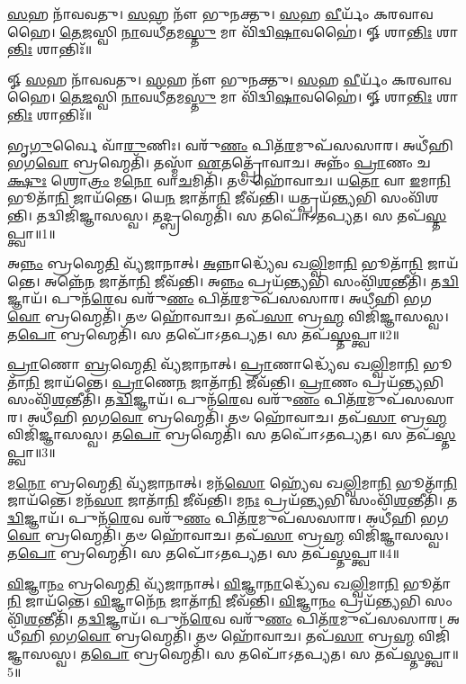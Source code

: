 \-\ul{𑌸}\-𑌹 𑌨𑌾᳴𑌵𑌵𑌤𑍁। 
\-\ul{𑌸}\-𑌹 𑌨𑍗᳴ 𑌭𑍁𑌨𑌕𑍍𑌤𑍁। 
\-\ul{𑌸}\-𑌹 \ul{𑌵𑍀}\-𑌰𑍍𑌯𑌂᳴ 𑌕𑌰𑌵𑌾𑌵𑌹𑍈। 
\-\ul{𑌤𑍇}\-\-\ul{𑌜}\-𑌸𑍍𑌵𑌿 \ul{𑌨𑌾}\-𑌵𑌧𑍀᳴𑌤𑌮\-\ul{𑌸𑍍𑌤𑍁} 𑌮𑌾 𑌵𑌿᳴𑌦𑍍𑌵𑌿\-\ul{𑌷𑌾}\-𑌵𑌹𑍈॑। 
𑍐 𑌶𑌾\-\ul{𑌨𑍍𑌤𑌿𑌃} 𑌶𑌾\-\ul{𑌨𑍍𑌤𑌿𑌃} 𑌶𑌾𑌨𑍍𑌤𑌿𑌃᳴॥

\setcounter{anuvakam}{0}
𑍐 \ul{𑌸}\-𑌹 𑌨𑌾᳴𑌵𑌵𑌤𑍁। 
\-\ul{𑌸}\-𑌹 𑌨𑍗᳴ 𑌭𑍁𑌨𑌕𑍍𑌤𑍁। 
\-\ul{𑌸}\-𑌹 \ul{𑌵𑍀}\-𑌰𑍍𑌯𑌂᳴ 𑌕𑌰𑌵𑌾𑌵𑌹𑍈। 
\-\ul{𑌤𑍇}\-\-\ul{𑌜}\-𑌸𑍍𑌵𑌿 \ul{𑌨𑌾}\-𑌵𑌧𑍀᳴𑌤𑌮\-\ul{𑌸𑍍𑌤𑍁} 𑌮𑌾 𑌵𑌿᳴𑌦𑍍𑌵𑌿\-\ul{𑌷𑌾}\-𑌵𑌹𑍈॑। 
𑍐 𑌶𑌾\-\ul{𑌨𑍍𑌤𑌿𑌃} 𑌶𑌾\-\ul{𑌨𑍍𑌤𑌿𑌃} 𑌶𑌾𑌨𑍍𑌤𑌿𑌃᳴॥


𑌭𑍃\-\ul{𑌗𑍁}\-𑌰𑍍𑌵𑍈 𑌵𑌾᳴\-\ul{𑌰𑍁}\-𑌣𑌿𑌃। 
𑌵𑌰𑍁᳴\-\ul{𑌣𑌂} 𑌪𑌿𑌤᳴\-\ul{𑌰}\-𑌮𑍁𑌪᳴𑌸𑌸𑌾𑌰। 
𑌅𑌧𑍀᳴𑌹𑌿 𑌭𑌗\-\ul{𑌵𑍋} 𑌬𑍍𑌰𑌹𑍍𑌮𑍇𑌤𑌿᳴। 
𑌤𑌸𑍍𑌮𑌾᳴ \ul{𑌏}\-𑌤𑌤𑍍𑌪𑍍𑌰𑍋᳴𑌵𑌾𑌚। 
𑌅𑌨𑍍𑌨𑌂᳴ \ul{𑌪𑍍𑌰𑌾}\-𑌣𑌂 𑌚\-\ul{𑌕𑍍𑌷𑍁𑌃} 𑌶𑍍𑌰𑍋\-\ul{𑌤𑍍𑌰𑌂} 𑌮\-\ul{𑌨𑍋} 𑌵𑌾\-\ul{𑌚}\-𑌮𑌿𑌤𑌿᳴। 
𑌤𑍞 𑌹𑍋᳴𑌵𑌾𑌚। 
𑌯\-\ul{𑌤𑍋} 𑌵𑌾 \ul{𑌇}\-𑌮𑌾\-\ul{𑌨𑌿} 𑌭𑍂𑌤𑌾᳴\-\ul{𑌨𑌿} 𑌜𑌾𑌯᳴𑌨𑍍𑌤𑍇। 
𑌯𑍇\-\ul{𑌨} 𑌜𑌾𑌤𑌾᳴\-\ul{𑌨𑌿} 𑌜𑍀𑌵᳴𑌨𑍍𑌤𑌿। 
𑌯𑌤𑍍𑌪𑍍𑌰𑌯᳴\-\ul{𑌨𑍍𑌤𑍍𑌯}\-𑌭𑌿 𑌸𑌂𑌵𑌿᳴𑌶𑌨𑍍𑌤𑌿। 
𑌤𑌦𑍍𑌵𑌿𑌜𑌿᳴𑌜𑍍𑌞𑌾𑌸𑌸𑍍𑌵। 
𑌤𑌦𑍍𑌬𑍍𑌰𑌹𑍍𑌮𑍇𑌤𑌿᳴। 
𑌸 𑌤𑌪𑍋᳴𑌽𑌤𑌪𑍍𑌯𑌤। 
𑌸 𑌤𑌪᳴\-\ul{𑌸𑍍𑌤}\-𑌪𑍍𑌤𑍍𑌵𑌾॥1॥

𑌅\-\ul{𑌨𑍍𑌨𑌂} 𑌬𑍍𑌰𑌹𑍍𑌮𑍇\-\ul{𑌤𑌿} 𑌵𑍍𑌯᳴𑌜𑌾𑌨𑌾𑌤𑍍। 
\-\ul{𑌅}\-𑌨𑍍𑌨𑌾𑌦𑍍𑌧𑍍𑌯𑍇᳴𑌵 𑌖\-\ul{𑌲𑍍𑌵𑌿}\-𑌮𑌾\-\ul{𑌨𑌿} 𑌭𑍂𑌤𑌾᳴\-\ul{𑌨𑌿} 𑌜𑌾𑌯᳴𑌨𑍍𑌤𑍇। 
𑌅𑌨𑍍𑌨𑍇᳴\-\ul{𑌨} 𑌜𑌾𑌤𑌾᳴\-\ul{𑌨𑌿} 𑌜𑍀𑌵᳴𑌨𑍍𑌤𑌿। 
𑌅\-\ul{𑌨𑍍𑌨𑌂} 𑌪𑍍𑌰𑌯᳴\-\ul{𑌨𑍍𑌤𑍍𑌯}\-𑌭𑌿 𑌸𑌂𑌵𑌿᳴\-\ul{𑌶}\-𑌨𑍍𑌤𑍀𑌤𑌿᳴। 
𑌤\-\ul{𑌦𑍍𑌵𑌿}\-𑌜𑍍𑌞𑌾𑌯᳴। 
𑌪𑍁𑌨᳴\-\ul{𑌰𑍇}\-𑌵 𑌵𑌰𑍁᳴\-\ul{𑌣𑌂} 𑌪𑌿𑌤᳴\-\ul{𑌰}\-𑌮𑍁𑌪᳴𑌸𑌸𑌾𑌰। 
𑌅𑌧𑍀᳴𑌹𑌿 𑌭𑌗\-\ul{𑌵𑍋} 𑌬𑍍𑌰𑌹𑍍𑌮𑍇𑌤𑌿᳴। 
𑌤𑍞 𑌹𑍋᳴𑌵𑌾𑌚। 
𑌤𑌪᳴\-\ul{𑌸𑌾} 𑌬𑍍𑌰\-\ul{𑌹𑍍𑌮} 𑌵𑌿𑌜𑌿᳴𑌜𑍍𑌞𑌾𑌸𑌸𑍍𑌵। 
𑌤\-\ul{𑌪𑍋} 𑌬𑍍𑌰𑌹𑍍𑌮𑍇𑌤𑌿᳴। 
𑌸 𑌤𑌪𑍋᳴𑌽𑌤𑌪𑍍𑌯𑌤। 
𑌸 𑌤𑌪᳴\-\ul{𑌸𑍍𑌤}\-𑌪𑍍𑌤𑍍𑌵𑌾॥2॥

\-\ul{𑌪𑍍𑌰𑌾}\-𑌣𑍋 \ul{𑌬𑍍𑌰}\-𑌹𑍍𑌮𑍇\-\ul{𑌤𑌿} 𑌵𑍍𑌯᳴𑌜𑌾𑌨𑌾𑌤𑍍। 
\-\ul{𑌪𑍍𑌰𑌾}\-𑌣𑌾𑌦𑍍𑌧𑍍𑌯𑍇᳴𑌵 𑌖\-\ul{𑌲𑍍𑌵𑌿}\-𑌮𑌾\-\ul{𑌨𑌿} 𑌭𑍂𑌤𑌾᳴\-\ul{𑌨𑌿} 𑌜𑌾𑌯᳴𑌨𑍍𑌤𑍇। 
\-\ul{𑌪𑍍𑌰𑌾}\-𑌣𑍇\-\ul{𑌨} 𑌜𑌾𑌤𑌾᳴\-\ul{𑌨𑌿} 𑌜𑍀𑌵᳴𑌨𑍍𑌤𑌿। 
\-\ul{𑌪𑍍𑌰𑌾}\-𑌣𑌂 𑌪𑍍𑌰𑌯᳴\-\ul{𑌨𑍍𑌤𑍍𑌯}\-𑌭𑌿 𑌸𑌂𑌵𑌿᳴\-\ul{𑌶}\-𑌨𑍍𑌤𑍀𑌤𑌿᳴। 
𑌤\-\ul{𑌦𑍍𑌵𑌿}\-𑌜𑍍𑌞𑌾𑌯᳴। 
𑌪𑍁𑌨᳴\-\ul{𑌰𑍇}\-𑌵 𑌵𑌰𑍁᳴\-\ul{𑌣𑌂} 𑌪𑌿𑌤᳴\-\ul{𑌰}\-𑌮𑍁𑌪᳴𑌸𑌸𑌾𑌰। 
𑌅𑌧𑍀᳴𑌹𑌿 𑌭𑌗\-\ul{𑌵𑍋} 𑌬𑍍𑌰𑌹𑍍𑌮𑍇𑌤𑌿᳴। 
𑌤𑍞 𑌹𑍋᳴𑌵𑌾𑌚। 
𑌤𑌪᳴\-\ul{𑌸𑌾} 𑌬𑍍𑌰\-\ul{𑌹𑍍𑌮} 𑌵𑌿𑌜𑌿᳴𑌜𑍍𑌞𑌾𑌸𑌸𑍍𑌵। 
𑌤\-\ul{𑌪𑍋} 𑌬𑍍𑌰𑌹𑍍𑌮𑍇𑌤𑌿᳴। 
𑌸 𑌤𑌪𑍋᳴𑌽𑌤𑌪𑍍𑌯𑌤। 
𑌸 𑌤𑌪᳴\-\ul{𑌸𑍍𑌤}\-𑌪𑍍𑌤𑍍𑌵𑌾॥3॥

𑌮\-\ul{𑌨𑍋} 𑌬𑍍𑌰𑌹𑍍𑌮𑍇\-\ul{𑌤𑌿} 𑌵𑍍𑌯᳴𑌜𑌾𑌨𑌾𑌤𑍍। 
𑌮𑌨᳴\-\ul{𑌸𑍋} 𑌹𑍍𑌯𑍇᳴𑌵 𑌖\-\ul{𑌲𑍍𑌵𑌿}\-𑌮𑌾\-\ul{𑌨𑌿} 𑌭𑍂𑌤𑌾᳴\-\ul{𑌨𑌿} 𑌜𑌾𑌯᳴𑌨𑍍𑌤𑍇। 
𑌮𑌨᳴\-\ul{𑌸𑌾} 𑌜𑌾𑌤𑌾᳴\-\ul{𑌨𑌿} 𑌜𑍀𑌵᳴𑌨𑍍𑌤𑌿। 
𑌮\-\ul{𑌨𑌃} 𑌪𑍍𑌰𑌯᳴\-\ul{𑌨𑍍𑌤𑍍𑌯}\-𑌭𑌿 𑌸𑌂𑌵𑌿᳴\-\ul{𑌶}\-𑌨𑍍𑌤𑍀𑌤𑌿᳴। 
𑌤\-\ul{𑌦𑍍𑌵𑌿}\-𑌜𑍍𑌞𑌾𑌯᳴। 
𑌪𑍁𑌨᳴\-\ul{𑌰𑍇}\-𑌵 𑌵𑌰𑍁᳴\-\ul{𑌣𑌂} 𑌪𑌿𑌤᳴\-\ul{𑌰}\-𑌮𑍁𑌪᳴𑌸𑌸𑌾𑌰। 
𑌅𑌧𑍀᳴𑌹𑌿 𑌭𑌗\-\ul{𑌵𑍋} 𑌬𑍍𑌰𑌹𑍍𑌮𑍇𑌤𑌿᳴। 
𑌤𑍞 𑌹𑍋᳴𑌵𑌾𑌚। 
𑌤𑌪᳴\-\ul{𑌸𑌾} 𑌬𑍍𑌰\-\ul{𑌹𑍍𑌮} 𑌵𑌿𑌜𑌿᳴𑌜𑍍𑌞𑌾𑌸𑌸𑍍𑌵। 
𑌤\-\ul{𑌪𑍋} 𑌬𑍍𑌰𑌹𑍍𑌮𑍇𑌤𑌿᳴। 
𑌸 𑌤𑌪𑍋᳴𑌽𑌤𑌪𑍍𑌯𑌤। 
𑌸 𑌤𑌪᳴\-\ul{𑌸𑍍𑌤}\-𑌪𑍍𑌤𑍍𑌵𑌾॥4॥

\-\ul{𑌵𑌿}\-𑌜𑍍𑌞𑌾\-\ul{𑌨𑌂} 𑌬𑍍𑌰𑌹𑍍𑌮𑍇\-\ul{𑌤𑌿} 𑌵𑍍𑌯᳴𑌜𑌾𑌨𑌾𑌤𑍍। 
\-\ul{𑌵𑌿}\-𑌜𑍍𑌞𑌾\-\ul{𑌨𑌾}\-𑌦𑍍𑌧𑍍𑌯𑍇᳴𑌵 𑌖\-\ul{𑌲𑍍𑌵𑌿}\-𑌮𑌾\-\ul{𑌨𑌿} 𑌭𑍂𑌤𑌾᳴\-\ul{𑌨𑌿} 𑌜𑌾𑌯᳴𑌨𑍍𑌤𑍇। 
\-\ul{𑌵𑌿}\-𑌜𑍍𑌞𑌾𑌨𑍇᳴\-\ul{𑌨} 𑌜𑌾𑌤𑌾᳴\-\ul{𑌨𑌿} 𑌜𑍀𑌵᳴𑌨𑍍𑌤𑌿। 
\-\ul{𑌵𑌿}\-𑌜𑍍𑌞𑌾\-\ul{𑌨𑌂} 𑌪𑍍𑌰𑌯᳴\-\ul{𑌨𑍍𑌤𑍍𑌯}\-𑌭𑌿 𑌸𑌂𑌵𑌿᳴\-\ul{𑌶}\-𑌨𑍍𑌤𑍀𑌤𑌿᳴। 
𑌤\-\ul{𑌦𑍍𑌵𑌿}\-𑌜𑍍𑌞𑌾𑌯᳴। 
𑌪𑍁𑌨᳴\-\ul{𑌰𑍇}\-𑌵 𑌵𑌰𑍁᳴\-\ul{𑌣𑌂} 𑌪𑌿𑌤᳴\-\ul{𑌰}\-𑌮𑍁𑌪᳴𑌸𑌸𑌾𑌰। 
𑌅𑌧𑍀᳴𑌹𑌿 𑌭𑌗\-\ul{𑌵𑍋} 𑌬𑍍𑌰𑌹𑍍𑌮𑍇𑌤𑌿᳴। 
𑌤𑍞 𑌹𑍋᳴𑌵𑌾𑌚। 
𑌤𑌪᳴\-\ul{𑌸𑌾} 𑌬𑍍𑌰\-\ul{𑌹𑍍𑌮} 𑌵𑌿𑌜𑌿᳴𑌜𑍍𑌞𑌾𑌸𑌸𑍍𑌵। 
𑌤\-\ul{𑌪𑍋} 𑌬𑍍𑌰𑌹𑍍𑌮𑍇𑌤𑌿᳴। 
𑌸 𑌤𑌪𑍋᳴𑌽𑌤𑌪𑍍𑌯𑌤। 
𑌸 𑌤𑌪᳴\-\ul{𑌸𑍍𑌤}\-𑌪𑍍𑌤𑍍𑌵𑌾॥5॥

